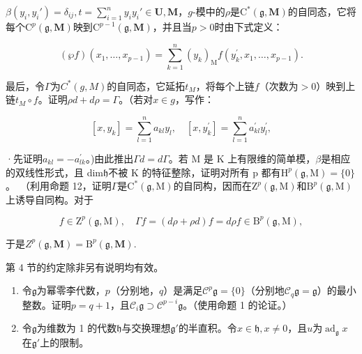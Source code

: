 \(\beta(y_i, y_i') = \delta_{ij}, t = \sum_{i=1}^{n} y_i y_i' \in \mathbf{U}, \mathbf{M}\)，\(g\)-模中的\(\rho\)是\(\mathrm{C}^*(\mathfrak{g}, \mathbf{M})\)的自同态，它将每个\(\mathrm{C}^p(\mathfrak{g}, \mathbf{M})\)映到\(\mathrm{C}^{p-1}(\mathfrak{g}, \mathbf{M})\)，并且当\(p > 0\)时由下式定义：

\[
(\wp f) (x _ {1}, \dots , x _ {p - 1}) = \sum_ {k = 1} ^ {n} (y _ {k}) _ {\mathrm{M}} f (y _ {k} ^ {\prime}, x _ {1}, \dots , x _ {p - 1}).
\]

最后，令\(\Gamma\)为\(C^*(g, M)\)的自同态，它延拓\(t_M\)，将每个上链\(f\)（次数为\(>0\)）映到上链\(t_M \circ f\)。证明\(\rho d + d\rho = \Gamma\)。（若对\(x \in g\)，写作：

\[
[ x, y _ {k} ] = \sum_ {l = 1} ^ {n} a _ {k l} y _ {l}, \quad [ x, y _ {k} ^ {\prime} ] = \sum_ {l = 1} ^ {n} a _ {k l} ^ {\prime} y _ {l} ^ {\prime},
\]

·先证明\(a_{kl} = -a_{lk}^{\prime}\)。)由此推出\(\Gamma d = d\Gamma\)。若 M 是 K 上有限维的简单模，\(\beta\)是相应的双线性形式，且 dim\(\mathfrak{h}\)不被 K 的特征整除，证明对所有 p 都有\(\mathrm{H}^{p}(\mathfrak{g},\mathrm{M})=\{0\}\)。~（利用命题 12，证明\(\Gamma\)是\(\mathrm{C}^{*}(\mathfrak{g},\mathrm{M})\)的自同构，因而在\(\mathrm{Z}^{p}(\mathfrak{g},\mathrm{M})\)和\(\mathrm{B}^{p}(\mathfrak{g},\mathrm{M})\)上诱导自同构。对于

\[
f \in \mathrm{Z} ^ {p} (\mathfrak {g}, \mathrm{M}), \quad \Gamma f = (d \rho + \rho d) f = d \rho f \in \mathrm{B} ^ {p} (\mathfrak {g}, \mathrm{M}),
\]

于是\(Z^{p}(\mathfrak{g},\mathbf{M}) = \mathrm{B}^{p}(\mathfrak{g},\mathbf{M}).\)


第 4 节的约定除非另有说明均有效。

\begin{enumerate}
\def\labelenumi{\arabic{enumi}.}
\item
  令\(\mathfrak{g}\)为幂零李代数，\(p\)（分别地，\(q\)）是满足\(\mathcal{C}^p\mathfrak{g} = \{0\}\)（分别地\(\mathcal{C}_q\mathfrak{g} = \mathfrak{g}\)）的最小整数。证明\(p = q + 1\)，且\(\mathcal{C}_i\mathfrak{g} \supset \mathcal{C}^{p - i}\mathfrak{g}\)。（使用命题 1 的论证。）
\item
  令\(\mathfrak{g}\)为维数为 1 的代数\(\mathfrak{h}\)与交换理想\(\mathfrak{g}'\)的半直积。令\(x \in \mathfrak{h}, x \neq 0\)，且\(u\)为\(\operatorname{ad}_{\mathfrak{g}} x\)在\(\mathfrak{g}'\)上的限制。
\end{enumerate}

